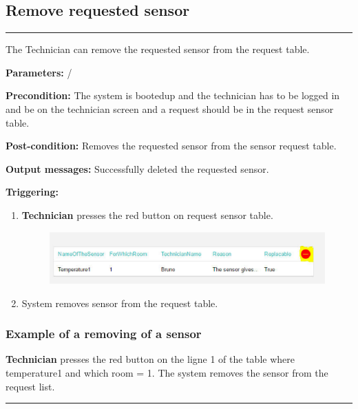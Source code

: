\break
\subsection{Remove  requested sensor}

\hrule
\hfill
\vspace{0.5cm}
\label{operation:Remove a new sensor}

The Technician can remove the requested sensor from the request table.
\begin{description}
\item \textbf{Parameters:} /
\item \textbf{Precondition:} The system is bootedup and the technician has to be
logged in and be on the technician screen and a request should be in the
request sensor table.
\item \textbf{Post-condition:} Removes the requested sensor from the sensor
request table.
\item \textbf{Output messages:} Successfully deleted the requested sensor.
\item \textbf{Triggering:}
\begin{enumerate}
\item \textbf{Technician} presses the red button on request sensor table.
\begin{figure}[H]
\includegraphics[width=1\textwidth]{images/RemoveSensorFromSensorRequestListTechnician.eps}
\end{figure}
\item System removes sensor from the request table.
\end{enumerate}
\end{description}

\subsubsection{Example of a removing of a sensor}
\textbf{Technician} presses the red button on the ligne 1 of the table where
temperature1 and which room = 1. The system removes the sensor from the request
list.

\hfill
\vspace{0.5cm}
\hrule



